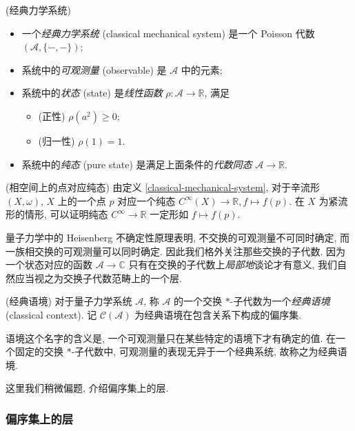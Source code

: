 \begin{definition}
	[label={classical-mechanical-system}]
	{(经典力学系统)}
	\begin{itemize}
		\item 一个\emph{经典力学系统} (classical mechanical system) 是一个 Poisson 代数 $(\mathcal A,\{-,-\})$;
		\item 系统中的\emph{可观测量} (observable) 是 $\mathcal A$ 中的元素;
		\item 系统中的\emph{状态} (state) 是\emph{线性函数} $\rho\colon \mathcal A\to \mathbb{R}$, 满足
		\begin{itemize}
			\item (正性) $\rho(a^2)\geq 0$;
			\item (归一性) $\rho(1)=1$.
		\end{itemize}
		\item 系统中的\emph{纯态} (pure state) 是满足上面条件的\emph{代数同态} $\mathcal A\to\mathbb{R}$.
	\end{itemize}
\end{definition}

\begin{remark}
	{(相空间上的点对应纯态)}
	由定义 \ref{classical-mechanical-system}, 对于辛流形 $(X,\omega)$, $X$ 上的一个点 $p$ 对应一个纯态 $C^\infty (X)\to\mathbb{R},f\mapsto f(p)$.
	在 $X$ 为紧流形的情形, 可以证明纯态 $C^\infty \to\mathbb{R}$ 一定形如 $f\mapsto f(p)$.
\end{remark}

量子力学中的 Heisenberg 不确定性原理表明, 不交换的可观测量不可同时确定, 而一族相交换的可观测量可以同时确定. 因此我们格外关注那些交换的子代数. 因为一个状态对应的函数 $\mathcal A\to \mathbb{C}$ 只有在交换的子代数上\emph{局部地}谈论才有意义, 我们自然应当视之为交换子代数范畴上的一个层.

\begin{definition}
    {(经典语境)}
    对于量子力学系统 $\mathcal A$, 称 $\mathcal A$ 的一个交换 $*$-子代数为一个\emph{经典语境} (classical context).
    记 $\mathcal C(\mathcal A)$ 为经典语境在包含关系下构成的偏序集.
\end{definition}

\begin{remark}
    {}
    语境这个名字的含义是, 一个可观测量只在某些特定的语境下才有确定的值. 在一个固定的交换 $*$-子代数中, 可观测量的表现无异于一个经典系统, 故称之为经典语境.
\end{remark}

这里我们稍微偏题, 介绍偏序集上的层.

\subsubsection{偏序集上的层}

